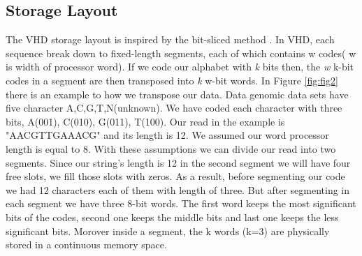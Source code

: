  \subsection{Storage Layout}
The VHD storage layout is inspired by the bit-sliced method \cite{O_Neil_1997}. In VHD, each sequence break down to fixed-length segments, each of which contains w codes( w is width of processor word). If we code our alphabet with \emph{k} bits then, the \emph{w} k-bit codes in a segment are then transposed into \emph{k} w-bit words. In Figure \ref{fig:fig2} there is an example to how we transpose our data. Data genomic data sets have five character A,C,G,T,N(unknown). We have coded each character with three bits, A(001), C(010), G(011), T(100). Our read in the example is "AACGTTGAAACG" and its length is 12. We assumed our word processor length is equal to 8. With these assumptions we can divide our read into two segments. Since our string's length is 12 in the second segment we will have four free slots, we fill those slots with zeros. As a result, before segmenting our code we had 12 characters each of them with length of three. But after segmenting in each segment we have three 8-bit words. The first word keeps the most significant bits of the codes, second one keeps the middle bits and last one keeps the less significant bits. Morover inside a segment, the k words (k=3) are physically stored in a continuous memory space.
 